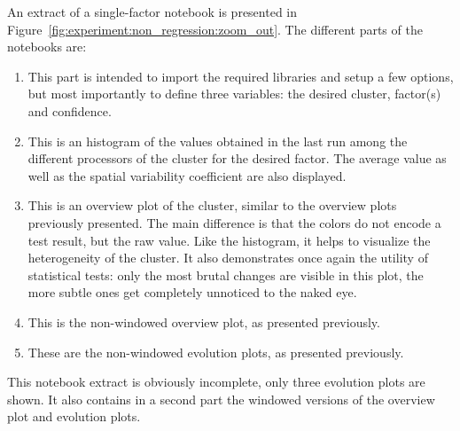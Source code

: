                An extract of a single-factor notebook is presented in
                Figure~\ref{fig:experiment:non_regression:zoom_out}. The different parts of the notebooks are:
                \begin{enumerate}[label=\alph*]
                    \item This part is intended to import the required libraries and setup a few options, but most
                        importantly to define three variables: the desired cluster, factor(s) and confidence.
                    \item This is an histogram of the values obtained in the last run among the different processors of
                        the cluster for the desired factor. The average value as well as the spatial variability
                        coefficient are also displayed.
                    \item This is an overview plot of the cluster, similar to the overview plots previously presented.
                        The main difference is that the colors do not encode a test result, but the raw value. Like the
                        histogram, it helps to visualize the heterogeneity of the cluster. It also demonstrates once
                        again the utility of statistical tests: only the most brutal changes are visible in this plot,
                        the more subtle ones get completely unnoticed to the naked eye.
                    \item This is the non-windowed overview plot, as presented previously.
                    \item These are the non-windowed evolution plots, as presented previously.
                \end{enumerate}
                This notebook extract is obviously incomplete, only three evolution plots are shown. It also contains in
                a second part the windowed versions of the overview plot and evolution plots.

